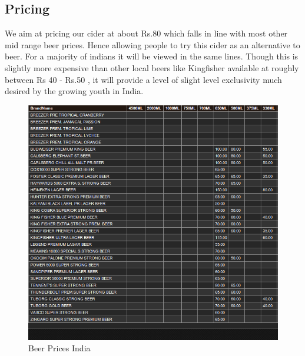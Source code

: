 \documentclass[11pt]{article}
\begin{document}
	\subsection{Pricing}
	We aim at pricing our cider at about Rs.80 which falls in line with most other mid range beer prices. Hence allowing people to try this cider as an alternative to beer. For a majority of indians it  will be viewed in the same lines. Though this is slightly more expensive than other local beers like Kingfisher available at roughly between Rs 40 - Rs.50 , it will provide a level of slight level exclusivity much desired by the growing youth in India.

	\begin{figure}[h!]
	\caption{Beer Prices India}
	\centering
	\includegraphics[width=\textwidth]{beerprices.png}
	\end{figure}
\end{document}
